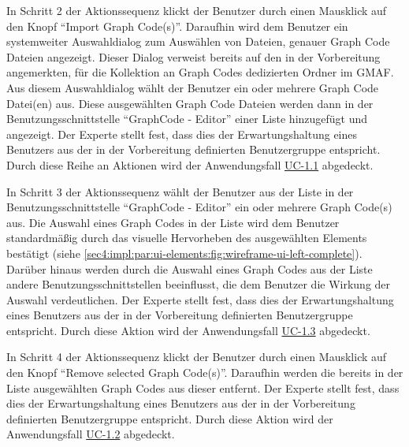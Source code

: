 In Schritt 2 der Aktionssequenz klickt der Benutzer durch einen Mausklick auf den Knopf \enquote{Import Graph Code(s)}.
Daraufhin wird dem Benutzer ein systemweiter Auswahldialog zum Auswählen von Dateien, genauer Graph Code Dateien angezeigt.
Dieser Dialog verweist bereits auf den in der Vorbereitung angemerkten, für die Kollektion an Graph Codes dedizierten Ordner im GMAF.
Aus diesem Auswahldialog wählt der Benutzer ein oder mehrere Graph Code Datei(en) aus.
Diese ausgewählten Graph Code Dateien werden dann in der Benutzungsschnittstelle \enquote{GraphCode - Editor} einer Liste hinzugefügt und angezeigt.
Der Experte stellt fest, dass dies der Erwartungshaltung eines Benutzers aus der in der Vorbereitung definierten Benutzergruppe entspricht.
Durch diese Reihe an Aktionen wird der Anwendungsfall \hyperref[sec3:model:uc-1.1]{UC-1.1} abgedeckt.

In Schritt 3 der Aktionssequenz wählt der Benutzer aus der Liste in der Benutzungsschnittstelle \enquote{GraphCode - Editor} ein oder mehrere Graph Code(s) aus.
Die Auswahl eines Graph Codes in der Liste wird dem Benutzer standardmäßig durch das visuelle Hervorheben des ausgewählten Elements bestätigt (siehe \cref{sec4:impl:par:ui-elements:fig:wireframe-ui-left-complete}).
Darüber hinaus werden durch die Auswahl eines Graph Codes aus der Liste andere Benutzungsschnittstellen beeinflusst, die dem Benutzer die Wirkung der Auswahl verdeutlichen.
Der Experte stellt fest, dass dies der Erwartungshaltung eines Benutzers aus der in der Vorbereitung definierten Benutzergruppe entspricht.
Durch diese Aktion wird der Anwendungsfall \hyperref[sec3:model:uc-1.3]{UC-1.3} abgedeckt.

In Schritt 4 der Aktionssequenz klickt der Benutzer durch einen Mausklick auf den Knopf \enquote{Remove selected Graph Code(s)}.
Daraufhin werden die bereits in der Liste ausgewählten Graph Codes aus dieser entfernt.
Der Experte stellt fest, dass dies der Erwartungshaltung eines Benutzers aus der in der Vorbereitung definierten Benutzergruppe entspricht.
Durch diese Aktion wird der Anwendungsfall \hyperref[sec3:model:uc-1.2]{UC-1.2} abgedeckt.

